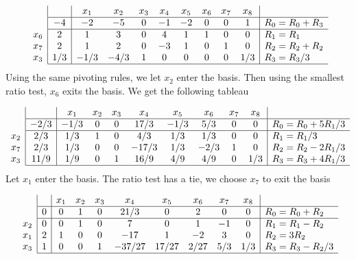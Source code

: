 $$
\begin{array}{c}
\\
\\
x_6\\
x_7 \\
x_3 \\ 
\end{array}
\begin{array}{|c|cccccccc|l}
     & x_1 & x_2 & x_3 & x_4 & x_5 & x_6 & x_7 & x_8  \\ \hline
  -4 & -2 & -5 & 0 & -1 & -2 & 0 & 0 & 1 & R_0 = R_0 + R_3\\ \hline
   2 & 1 & 3 & 0  & 4  & 1 & 1 & 0 & 0 & R_1 = R_1\\
   2 & 1 & 2 & 0 & -3 & 1 & 0 & 1 & 0 & R_2 = R_2 + R_2\\
   1/3 & -1/3 & -4/3 & 1 & 0 & 0 & 0 & 0 & 1/3 & R_3 = R_3/3  \\ \hline
\end{array}
$$
Using the same pivoting rules, we let $x_2$ enter the basis. Then using the smallest ratio test, $x_6$ exits the basis. We get the following tableau 

$$
\begin{array}{c}
\\
\\
x_2\\
x_7 \\
x_3 \\ 
\end{array}
\begin{array}{|c|cccccccc|l}
     & x_1 & x_2 & x_3 & x_4 & x_5 & x_6 & x_7 & x_8  \\ \hline
  -2/3 & -1/3 & 0 & 0 & 17/3 & -1/3 & 5/3 & 0 & 0 & R_0 = R_0 + 5R_1/3 \\ \hline
   2/3 & 1/3 & 1 & 0  & 4/3  & 1/3 & 1/3 & 0 & 0 & R_1 = R_1/3\\
   2/3 & 1/3 & 0 & 0 & -17/3 & 1/3 & -2/3 & 1 & 0 & R_2 = R_2 - 2 R_1/3\\
   11/9 & 1/9 & 0 & 1 & 16/9 & 4/9 & 4/9 & 0 & 1/3 & R_3 = R_3 + 4R_1 /3  \\ \hline
\end{array}
$$
Let $x_1$ enter the basis. The ratio test has a tie, we choose $x_7$ to exit the basis

$$
\begin{array}{c}
\\
\\
x_2\\
x_1 \\
x_3 \\ 
\end{array}
\begin{array}{|c|cccccccc|l}
     & x_1 & x_2 & x_3 & x_4 & x_5 & x_6 & x_7 & x_8  \\ \hline
   0 & 0 & 1 & 0 & 21/3 & 0 & 2 & 0 & 0 & R_0 = R_0 + R_2 \\ \hline
   0 & 0 & 1 & 0  & 7  & 0 & 1 & -1 & 0 & R_1 = R_1 - R_2\\
   2 & 1 & 0 & 0 & -17 & 1 & -2 & 3 & 0 & R_2 = 3R_2 \\
   1 & 0 & 0 & 1 & -37/27 & 17/27 & 2/27 & 5/3 & 1/3 & R_3 = R_3 - R_2 /3  \\ \hline
\end{array}
$$

